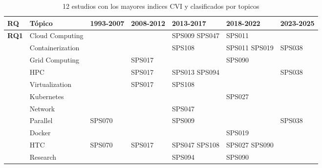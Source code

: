 \begin{table*}[htbp]
	\centering
	\caption{12 estudios con los mayores indices CVI y clasificados por topicos}
	\label{table:highest_CVI}
	\renewcommand{\arraystretch}{1.2}
	\setlength{\tabcolsep}{6pt}
	\begin{tabularx}{\textwidth}{p{0.8cm}p{2.5cm}>{\raggedright\arraybackslash}X>{\raggedright\arraybackslash}X>{\raggedright\arraybackslash}X>{\raggedright\arraybackslash}X>{\raggedright\arraybackslash}X}
		\toprule
		\textbf{RQ}                          & \textbf{Tópico}  & \textbf{1993-2007} & \textbf{2008-2012} & \textbf{2013-2017} & \textbf{2018-2022} & \textbf{2023-2025} \\
		\midrule
		\multirow{12}{*}[0em]{\textbf{RQ1}}  & Cloud Computing  &                    &                    & SPS009 SPS047      & SPS011             &                    \\
		\addlinespace[0.3em]
		                                     & Containerization &                    &                    & SPS108             & SPS011 SPS019      & SPS038             \\
		\addlinespace[0.3em]
		                                     & Grid Computing   &                    & SPS017             &                    & SPS090             &                    \\
		\addlinespace[0.3em]
		                                     & HPC              &                    & SPS017             & SPS013 SPS094      &                    & SPS038             \\
		\addlinespace[0.3em]
		                                     & Virtualization   &                    & SPS017             & SPS108             &                    &                    \\
		\addlinespace[0.3em]
		                                     & Kubernetes       &                    &                    &                    & SPS027             &                    \\
		\addlinespace[0.3em]
		                                     & Network          &                    &                    & SPS047             &                    &                    \\
		\addlinespace[0.3em]
		                                     & Parallel         & SPS070             &                    & SPS009             &                    & SPS038             \\
		\addlinespace[0.3em]
		                                     & Docker           &                    &                    &                    & SPS019             &                    \\
		\addlinespace[0.3em]
		                                     & HTC              & SPS070             & SPS017             & SPS047 SPS108      & SPS027 SPS090      &                    \\
		\midrule
		\multirow{0}{*}[1.2em]{\textbf{RQ2}} & Research         &                    &                    & SPS094             & SPS090             &                    \\
		\bottomrule
	\end{tabularx}
\end{table*}

